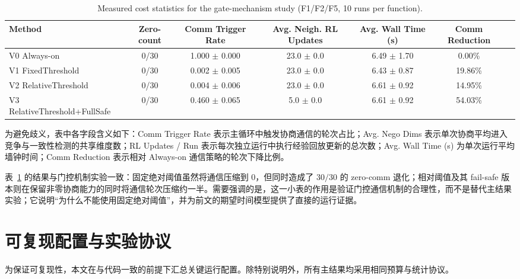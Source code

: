\documentclass[conference]{IEEEtran}
\begin{document}
\begin{table}[t]
\centering
\caption{Measured cost statistics for the gate-mechanism study (F1/F2/F5, 10 runs per function).}
  \label{tab:gate_cost_stats}
  \setlength{\tabcolsep}{2.5pt}
\begin{tabular}{lcccccc}
\toprule
Method & Zero-count & Comm Trigger Rate & Avg. Neigh. RL Updates & Avg. Wall Time (s) & Comm Reduction \\
\midrule
V0 Always-on & 0/30 & 1.000 $\pm$ 0.000 & 23.0 $\pm$ 0.0 & 6.49 $\pm$ 1.70 & 0.00\% \\
V1 FixedThreshold & 0/30 & 0.002 $\pm$ 0.005 & 23.0 $\pm$ 0.0 & 6.43 $\pm$ 0.87 & 19.86\% \\
V2 RelativeThreshold & 0/30 & 0.004 $\pm$ 0.006 & 23.0 $\pm$ 0.0 & 6.61 $\pm$ 0.92 & 14.95\% \\
V3 RelativeThreshold+FullSafe & 0/30 & 0.460 $\pm$ 0.065 & 5.0 $\pm$ 0.0 & 6.61 $\pm$ 0.92 & 54.03\% \\
\bottomrule
\end{tabular}
\end{table}

为避免歧义，表中各字段含义如下：Comm Trigger Rate 表示主循环中触发协商通信的轮次占比；Avg. Nego Dims 表示单次协商平均进入竞争与一致性检测的共享维度数；RL Updates / Run 表示每次独立运行中执行经验回放更新的总次数；Avg. Wall Time (s) 为单次运行平均墙钟时间；Comm Reduction 表示相对 Always-on 通信策略的轮次下降比例。

表~\ref{tab:gate_cost_stats} 的结果与门控机制实验一致：固定绝对阈值虽然将通信压缩到 0，但同时造成了 $30/30$ 的 zero-comm 退化；相对阈值及其 fail-safe 版本则在保留非零协商能力的同时将通信轮次压缩约一半。需要强调的是，这一小表的作用是验证门控通信机制的合理性，而不是替代主结果实验；它说明“为什么不能使用固定绝对阈值”，并为前文的期望时间模型提供了直接的运行证据。

\section{可复现配置与实验协议}

为保证可复现性，本文在与代码一致的前提下汇总关键运行配置。除特别说明外，所有主结果均采用相同预算与统计协议。
\end{document}
